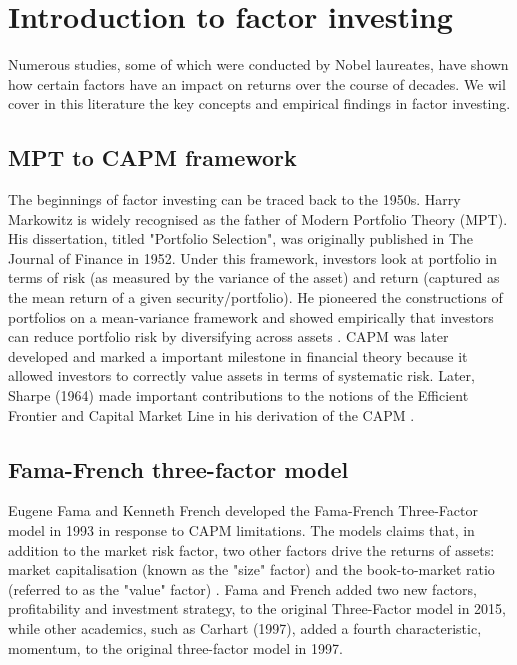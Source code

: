 \documentclass{article}
\begin{document}
\section{Introduction to factor investing}

Numerous studies, some of which were conducted by Nobel laureates, have shown how certain factors have an impact on returns over the course of decades. We wil cover in this literature the key concepts and empirical findings in factor investing.\newline

\subsection{MPT to CAPM framework}

The beginnings of factor investing can be traced back to the 1950s. Harry Markowitz is widely recognised as the father of Modern Portfolio Theory (MPT). His dissertation, titled "Portfolio Selection", was originally published in The Journal of Finance in 1952. Under this framework, investors look at portfolio in terms of risk (as measured by the variance of the asset) and return (captured as the mean return of a given security/portfolio). He pioneered the constructions of portfolios on a mean-variance framework and showed empirically that investors can reduce portfolio risk by diversifying across assets \cite{markowitz1952}. CAPM was later developed and marked a important milestone in financial theory because it allowed investors to correctly value assets in terms of systematic risk. Later, Sharpe (1964) \cite{sharpe1964} made important contributions to the notions of the Efficient Frontier and Capital Market Line in his derivation of the CAPM .\newline


\subsection{Fama-French three-factor model}

Eugene Fama and Kenneth French developed the Fama-French Three-Factor model in 1993 in response to CAPM limitations. The models claims that, in addition to the market risk factor, two other factors drive the returns of assets: market capitalisation (known as the "size" factor) and the book-to-market ratio (referred to as the "value" factor) \cite{fama1993}. Fama and French added two new factors, profitability and investment strategy, to the original Three-Factor model in 2015, while other academics, such as Carhart (1997)\cite{carhart1997}, added a fourth characteristic, momentum, to the original three-factor model in 1997.\newline
\end{document}

